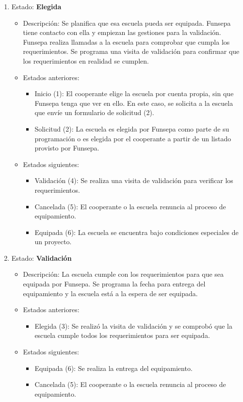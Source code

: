 \documentclass[11pt]{report}
\begin{document}
\begin{enumerate}
\begin{itemize}
		\end{itemize}
		\item Estado: \textbf{Elegida}
		\begin{itemize}
			\item Descripción: Se planifica que esa escuela pueda ser equipada. Funsepa tiene contacto con ella y empiezan las gestiones para la validación. Funsepa realiza llamadas a la escuela para comprobar que cumpla los requerimientos. Se programa una visita de validación para confirmar que los requerimientos en realidad se cumplen.
			\item Estados anteriores:
			\begin{itemize}
				\item Inicio (1): El cooperante elige la escuela por cuenta propia, sin que Funsepa tenga que ver en ello. En este caso, se solicita a la escuela que envíe un formulario de solicitud (2).
				\item Solicitud (2): La escuela es elegida por Funsepa como parte de su programación o es elegida por el cooperante a partir de un listado provisto por Funsepa.
			\end{itemize}
			\item Estados siguientes:
			\begin{itemize}
				\item Validación (4): Se realiza una visita de validación para verificar los requerimientos.
				\item Cancelada (5): El cooperante o la escuela renuncia al proceso de equipamiento.
				\item Equipada (6): La escuela se encuentra bajo condiciones especiales de un proyecto.
			\end{itemize}
		\end{itemize}
		
		\item Estado: \textbf{Validación}
		\begin{itemize}
			\item Descripción: La escuela cumple con los requerimientos para que sea equipada por Funsepa. Se programa la fecha para entrega del equipamiento y la escuela está a la espera de ser equipada.
			\item Estados anteriores:
			\begin{itemize}
				\item Elegida (3): Se realizó la visita de validación y se comprobó que la escuela cumple todos los requerimientos para ser equipada.
			\end{itemize}
			\item Estados siguientes:
			\begin{itemize}
				\item Equipada (6): Se realiza la entrega del equipamiento.
				\item Cancelada (5): El cooperante o la escuela renuncia al proceso de equipamiento.
			\end{itemize}
		\end{itemize}
		

\end{enumerate}
\end{document}
